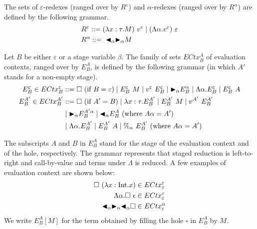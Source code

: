\begin{definition}[Redex]
  The sets of $\varepsilon$-redexes (ranged over by $R^\varepsilon$) and $\alpha$-redexes (ranged over by $R^\alpha$) are defined by the following grammar.
  \begin{align*}
     & R^\varepsilon ::= (\lambda x:\tau.M)\ v^\varepsilon \mid (\Lambda\alpha.v^\varepsilon)\ \varepsilon \\
     & R^\alpha      ::=\ {\mathop{\blacktriangleleft}}_\alpha {\mathop{\blacktriangleright}}_\alpha M                                                         \\
  \end{align*}
\end{definition}

\begin{definition}
  Let $B$ be either \(\varepsilon\) or a stage variable \(\beta\).
  The family of sets $ECtx^A_B$ of evaluation contexts, ranged over by $E^A_B$, is defined by the following grammar (in which $A'$ stands for a non-empty stage).
  \begin{align*}
    E^\varepsilon_B \in ECtx^\varepsilon_B & ::= \square\ (\text{if\ } B = \varepsilon)
    \mid E^\varepsilon_B\ M \mid v^\varepsilon\ E^\varepsilon_B \mid {\mathop{\blacktriangleright}}_\alpha E^\alpha_B
    \mid \Lambda\alpha.E^\varepsilon_B \mid E^\varepsilon_B\ A                                                                                    \\
    E^{A'}_B \in ECtx^{A'}_B               & ::= \square\ (\text{if } A' = B) \mid \lambda x:\tau.E^{A'}_B \mid E^{A'}_B\ M \mid v^{A'}\ E^{A'}_B \\
                                           & \mid {\mathop{\blacktriangleright}}_\alpha E^{A'\alpha}_B \mid {\mathop{\blacktriangleleft}}_\alpha E^{A}_B \ (\text{where } A\alpha = A')               \\
                                           & \mid \Lambda\alpha.E^{A'}_B \mid E^{A'}_B\ A \mid \%_\alpha\ E^{A'}_B \ (\text{where } A\alpha = A')
  \end{align*}
\end{definition}

The subscripts $A$ and $B$ in $E^A_B$ stand for the stage of the evaluation context and of the hole, respectively.  The grammar represents that staged reduction is left-to-right and call-by-value and terms under \(\Lambda\) is reduced.
A few examples of evaluation context are shown below:
\begin{align*}
  \square\ (\lambda x:\textrm{Int}.x)                  & \in  ECtx^\varepsilon_\varepsilon \\
  \Lambda\alpha.\square\ \epsilon            & \in ECtx^\varepsilon_\varepsilon  \\
  {\mathop{\blacktriangleleft}}_\alpha {\mathop{\blacktriangleright}}_\alpha {\mathop{\blacktriangleleft}}_\alpha \square & \in ECtx^\alpha_\varepsilon
\end{align*}
%
We write $E^A_B[M]$ for the term obtained by filling the hole $\square$ in $E^A_B$ by $M$.

